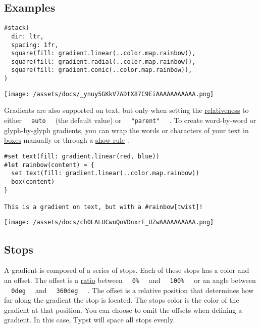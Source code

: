 \subsection{Examples}\label{examples}

\begin{verbatim}
#stack(
  dir: ltr,
  spacing: 1fr,
  square(fill: gradient.linear(..color.map.rainbow)),
  square(fill: gradient.radial(..color.map.rainbow)),
  square(fill: gradient.conic(..color.map.rainbow)),
)
\end{verbatim}

\texttt{[image: /assets/docs/\_ynuy5GKkV7ADtX87C9EiAAAAAAAAAAA.png]}

Gradients are also supported on text, but only when setting the
\href{/docs/reference/visualize/gradient/\#definitions-relative}{relativeness}
to either \texttt{\ }{\texttt{\ auto\ }}\texttt{\ } (the default value)
or \texttt{\ }{\texttt{\ "parent"\ }}\texttt{\ } . To create
word-by-word or glyph-by-glyph gradients, you can wrap the words or
characters of your text in \href{/docs/reference/layout/box/}{boxes}
manually or through a \href{/docs/reference/styling/\#show-rules}{show
rule} .

\begin{verbatim}
#set text(fill: gradient.linear(red, blue))
#let rainbow(content) = {
  set text(fill: gradient.linear(..color.map.rainbow))
  box(content)
}

This is a gradient on text, but with a #rainbow[twist]!
\end{verbatim}

\texttt{[image: /assets/docs/ch0LALUCwuQoVDnxrE\_UZwAAAAAAAAAA.png]}

\subsection{Stops}\label{stops}

A gradient is composed of a series of stops. Each of these stops has a
color and an offset. The offset is a
\href{/docs/reference/layout/ratio/}{ratio} between
\texttt{\ }{\texttt{\ 0\%\ }}\texttt{\ } and
\texttt{\ }{\texttt{\ 100\%\ }}\texttt{\ } or an angle between
\texttt{\ }{\texttt{\ 0deg\ }}\texttt{\ } and
\texttt{\ }{\texttt{\ 360deg\ }}\texttt{\ } . The offset is a relative
position that determines how far along the gradient the stop is located.
The stop\textquotesingle s color is the color of the gradient at that
position. You can choose to omit the offsets when defining a gradient.
In this case, Typst will space all stops evenly.


